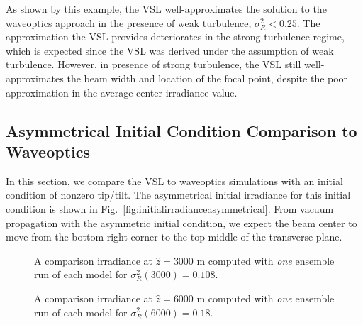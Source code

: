 \documentclass[9pt,twocolumn,twoside]{osajnl}
\begin{document}
As shown by this example, the VSL well-approximates the solution to the waveoptics 
approach in the presence of weak turbulence, $\sigma_{R}^2<0.25$. The approximation the VSL 
provides deteriorates in the strong turbulence regime, which is expected since the VSL was 
derived under the assumption of weak turbulence. However, in presence of strong turbulence, 
the VSL still well-approximates the beam width and location of the focal point, despite the 
poor approximation in the average center irradiance value. 

\vspace*{-3mm}
\subsection{Asymmetrical Initial Condition Comparison to Waveoptics}

In this section, we compare the VSL to waveoptics simulations with an initial condition of nonzero tip/tilt. The asymmetrical initial irradiance for this initial condition is shown in Fig.~\ref{fig:initialirradianceasymmetrical}.
From vacuum propagation with the asymmetric initial condition, we expect the beam center to move from the bottom right corner to the top middle of the transverse plane.  


\begin{figure}[t]
\centering 
{}
\vspace{-4mm}
\vspace{-1mm}
\caption{A comparison irradiance at $\widehat{z} = 3000$ m 
computed with \emph{one} ensemble run of each model for $\sigma_{R}^2(3000) = 0.108$. }
\label{fig: asym1runcomp2500} \vspace*{-3mm}
\end{figure}

\begin{figure}[t]
\centering 
{}
\vspace{-4mm}
\vspace{-1mm}
\caption{A comparison irradiance at $\widehat{z} = 6000 $ m computed with \emph{one} ensemble run of each model for $\sigma_{R}^2(6000) = 0.18$. }
\label{fig: asym1runcomp6000} \vspace*{-3mm}
\end{figure}
\end{document}
